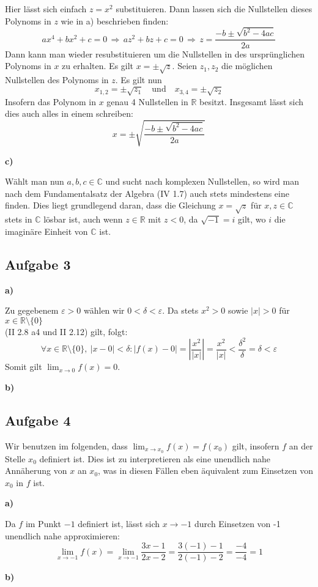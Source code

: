 \documentclass[a4paper,graphics,11pt]{article}
\newcommand{\aufgabe}[1]{\subsection*{Aufgabe #1}}
\begin{document}
Hier lässt sich einfach $z = x^2$ substituieren. Dann lassen sich die Nullstellen dieses
Polynoms in $z$ wie in a) beschrieben finden:
$$
    ax^4+bx^2+c = 0
    \,\Longrightarrow\, az^2+bz+c = 0
    \,\Longrightarrow\, z = \frac{-b \pm \sqrt{b^2-4ac}}{2a}
$$ 
Dann kann man wieder resubstituieren um die Nullstellen in des ursprünglichen Polynoms
in $x$ zu erhalten. Es gilt $x = \pm \sqrt{z}$. Seien $z_1, z_2$ die möglichen Nullstellen
des Polynoms in $z$. Es gilt nun
$$
    x_{1,2} = \pm\sqrt{z_1}\quad\text{und}\quad x_{3,4} = \pm \sqrt{z_2}
$$
Insofern das Polynom in $x$ genau 4 Nullstellen in $\mathbb{R}$ besitzt.
Insgesamt lässt sich dies auch alles in einem schreiben:
$$
    x = \pm\sqrt{\frac{-b\pm \sqrt{b^2-4ac}}{2a}}
$$

\textbf{c)}

Wählt man nun $a,b,c \in \mathbb{C}$ und sucht nach komplexen Nullstellen,
so wird man nach dem Fundamentalsatz der Algebra (IV 1.7) auch stets mindestens eine finden.
Dies liegt grundlegend daran, dass die Gleichung $x = \sqrt{z}$ für $x,z \in \mathbb{C}$
stets in $\mathbb{C}$ lösbar ist, auch wenn $z \in \mathbb{R}$ mit $z < 0$, da $\sqrt{-1} = i$
gilt, wo $i$ die imaginäre Einheit von $\mathbb{C}$ ist.


\aufgabe{3}
\textbf{a)}

Zu gegebenem $\varepsilon > 0$ wählen wir $0 < \delta < \varepsilon$. Da stets
$x^2 > 0$  sowie $|x| > 0$ für $x \in \mathbb{R}\setminus\{0\}$\\
(II 2.8 a4 und II 2.12) gilt, folgt:
$$
    \forall x \in \mathbb{R}\setminus \{0\},\ |x-0| < \delta \colon
    |f(x)-0| = \left|\frac{x^2}{|x|}\right| = \frac{x^2}{|x|} < \frac{\delta^2}{\delta} 
    = \delta < \varepsilon
$$
Somit gilt $\lim_{x \to 0}\limits f(x) = 0$.

\textbf{b)}


\newpage
\aufgabe{4}
Wir benutzen im folgenden, dass $\lim_{x \to x_0}\limits f(x) = f(x_0)$ gilt, insofern $f$ an
der Stelle $x_0$ definiert ist. Dies ist zu interpretieren als eine unendlich nahe
Annäherung von $x$ an $x_0$, was in diesen Fällen eben äquivalent zum Einsetzen von $x_0$ in
$f$ ist.

\textbf{a)}

Da $f$ im Punkt $-1$ definiert ist, lässt sich $x\to-1$ durch Einsetzen von -1 unendlich
nahe approximieren:
$$
    \lim_{x \to -1} f(x)
    = \lim_{x \to -1} \frac{3x-1}{2x-2}
    = \frac{3(-1)-1}{2(-1)-2} 
    = \frac{-4}{-4}
    = 1
$$

\textbf{b)}
\end{document}
